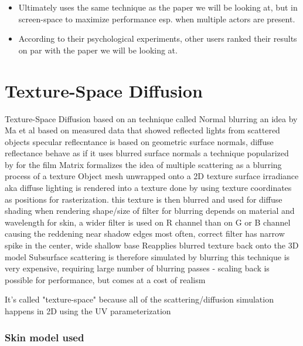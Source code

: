 \documentclass[ngerman,runningheads,a4paper]{llncs}[2018/03/10]
\begin{document}
\begin{itemize}
  \item Ultimately uses the same technique as the paper we will be looking at, but in screen-space to maximize performance esp. when multiple actors are present.
  \item According to their psychological experiments, other users ranked their results on par with the paper we will be looking at.
\end{itemize}

\section{Texture-Space Diffusion}
\label{sec:texture-space}

 Texture-Space Diffusion
 based on an technique called Normal blurring
   an idea by Ma et al based on measured data that showed reflected lights from scattered objects specular reflecntance is based on geometric surface normals, diffuse reflectance behave as if it uses blurred surface normals
 a technique popularized by \citet{realistic-human-face-rendering-matrix} for the film Matrix formalizes the idea of multiple scattering as a blurring process of a texture
 Object mesh unwrapped onto a 2D texture
 surface irradiance aka diffuse lighting is rendered into a texture
   done by using texture coordinates as positions for rasterization.
   this texture is then blurred and used for diffuse shading when rendering
   shape/size of filter for blurring depends on material and wavelength
     for skin, a wider filter is used on R channel than on G or B channel causing the reddening near shadow edges
     most often, correct filter has narrow spike in the center, wide shallow base
     Reapplies blurred texture back onto the 3D model
     Subsurface scattering is therefore simulated by blurring
 this technique is very expensive, requiring large number of blurring passes - scaling back is possible for performance, but comes at a cost of realism

\citet{efficient-human-skin-rendering}
It's called "texture-space" because all of the scattering/diffusion simulation happens in 2D using the UV parameterization

\subsubsection{Skin model used}
\label{sub:skin-model}
\end{document}
